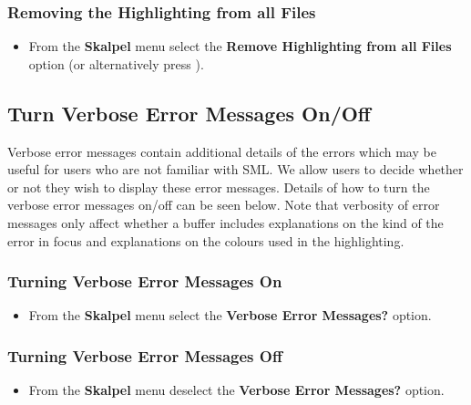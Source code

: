 \documentclass{report}
\begin{document}
\subsubsection{Removing the Highlighting from all Files}

\begin{itemize}
\item From the \textbf{Skalpel} menu select the \textbf{Remove
  Highlighting from all Files} option (or alternatively press
  ).
\end{itemize}


\subsection{Turn Verbose Error Messages On/Off}

Verbose error messages contain additional details of the errors which
may be useful for users who are not familiar with SML.  We allow users
to decide whether or not they wish to display these error messages.
Details of how to turn the verbose error messages on/off can be seen
below.  Note that verbosity of error messages only affect whether a
buffer includes explanations on the kind of the error in focus and
explanations on the colours used in the highlighting.

\subsubsection{Turning Verbose Error Messages On}

  \begin{itemize}
  \item From the \textbf{Skalpel}
    menu select the \textbf{Verbose Error Messages?} option.
  \end{itemize}

\subsubsection{Turning Verbose Error Messages Off}

  \begin{itemize}
  \item From the \textbf{Skalpel} menu
    deselect the \textbf{Verbose Error Messages?} option.
  \end{itemize}
\end{document}
